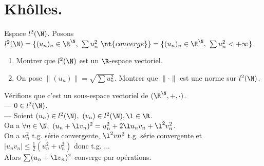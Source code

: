 \documentclass[11pt]{article}
\begin{document}
\pagebreak

\section{Khôlles.}

\begin{exercice}{Espace $l^2(\N)$.}{}
        Posons $l^2(\N)=\{(u_n)_n\in\R^\N ,~ \sum u_n^2 ~ \nt{converge}\} = \{(u_n)_n \in \R^\N, ~ \sum u_n^2 < +\infty\}$.
        \begin{enumerate}
            \item Montrer que $l^2(\N)$ est un $\R$-espace vectoriel.
            \item On pose $\|(u_n)\|=\sqrt{\sum u_n^2}$. Montrer que $\|\cdot\|$ est une norme sur $l^2(\N)$.
        \end{enumerate}
        \tcblower
         Vérifions que c'est un sous-espace vectoriel de $(\R^\N,+,\cdot)$.\\
        --- $0\in l^2(\N)$.\\
        --- Soient $(u_n)\in l^2(\N), ~ (v_n)\in l^2(\N), \l\in\R$.\\
        On a $\forall n \in \N, ~ (u_n + \l v_n)^2 = u_n^2 + 2\l u_n v_n + \l^2 v_n^2$.\\
        On a $u_n^2$ t.g. série convergente, $\l^2vn^2$ t.g. série convergente et $|u_nv_n|\leq\frac{1}{2}(u_n^2+v_n^2)$ donc t.g. ...\\
        Alors $\sum (u_n + \l v_n)^2$ converge par opérations. 
\end{exercice}
\end{document}

